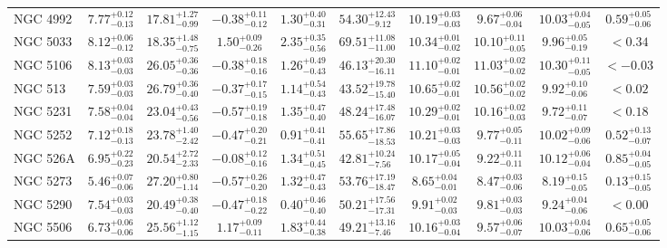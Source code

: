 \documentclass[onecolumn]{mn2e}
\begin{document}
\begin{landscape}
{\begin{center}
\begin{longtable}{lccccccccc}
NGC 4992 & $7.77_{-0.13}^{+0.12}$ & $17.81_{-0.99}^{+1.27}$ & $-0.38_{-0.12}^{+0.11}$ & $1.30_{-0.31}^{+0.40}$ &$54.30_{-9.12}^{+12.43}$ & $10.19_{-0.03}^{+0.03}$ & $9.67_{-0.04}^{+0.06}$ & $10.03_{-0.05}^{+0.04}$ & $0.59_{-0.06}^{+0.05}$ \\
NGC 5033 & $8.12_{-0.12}^{+0.06}$ & $18.35_{-0.75}^{+1.48}$ & $1.50_{-0.26}^{+0.09}$ & $2.35_{-0.56}^{+0.35}$ &$69.51_{-11.00}^{+11.08}$ & $10.34_{-0.02}^{+0.01}$ & $10.10_{-0.05}^{+0.11}$ & $9.96_{-0.19}^{+0.05}$ & $<0.34$ \\
NGC 5106 & $8.13_{-0.03}^{+0.03}$ & $26.05_{-0.36}^{+0.36}$ & $-0.38_{-0.16}^{+0.18}$ & $1.26_{-0.43}^{+0.49}$ &$46.13_{-16.11}^{+20.30}$ & $11.10_{-0.01}^{+0.02}$ & $11.03_{-0.02}^{+0.02}$ & $10.30_{-0.05}^{+0.11}$ & $<-0.03$ \\
NGC 513 & $7.59_{-0.03}^{+0.03}$ & $26.79_{-0.40}^{+0.36}$ & $-0.37_{-0.15}^{+0.17}$ & $1.14_{-0.43}^{+0.54}$ &$43.52_{-15.40}^{+19.78}$ & $10.65_{-0.01}^{+0.02}$ & $10.56_{-0.02}^{+0.02}$ & $9.92_{-0.06}^{+0.10}$ & $<0.02$ \\
NGC 5231 & $7.58_{-0.04}^{+0.04}$ & $23.04_{-0.56}^{+0.43}$ & $-0.57_{-0.18}^{+0.19}$ & $1.35_{-0.40}^{+0.47}$ &$48.24_{-16.07}^{+17.48}$ & $10.29_{-0.01}^{+0.02}$ & $10.16_{-0.03}^{+0.02}$ & $9.72_{-0.07}^{+0.11}$ & $<0.18$ \\
NGC 5252 & $7.12_{-0.13}^{+0.18}$ & $23.78_{-2.42}^{+1.40}$ & $-0.47_{-0.21}^{+0.20}$ & $0.91_{-0.41}^{+0.41}$ &$55.65_{-18.53}^{+17.86}$ & $10.21_{-0.03}^{+0.03}$ & $9.77_{-0.11}^{+0.05}$ & $10.02_{-0.06}^{+0.09}$ & $0.52_{-0.07}^{+0.13}$ \\
NGC 526A & $6.95_{-0.23}^{+0.22}$ & $20.54_{-2.33}^{+2.72}$ & $-0.08_{-0.16}^{+0.12}$ & $1.34_{-0.45}^{+0.51}$ &$42.81_{-7.56}^{+10.24}$ & $10.17_{-0.04}^{+0.05}$ & $9.22_{-0.11}^{+0.11}$ & $10.12_{-0.04}^{+0.06}$ & $0.85_{-0.05}^{+0.04}$ \\
NGC 5273 & $5.46_{-0.06}^{+0.07}$ & $27.20_{-1.14}^{+0.80}$ & $-0.57_{-0.20}^{+0.26}$ & $1.32_{-0.43}^{+0.47}$ &$53.76_{-18.47}^{+17.19}$ & $8.65_{-0.01}^{+0.04}$ & $8.47_{-0.06}^{+0.03}$ & $8.19_{-0.05}^{+0.15}$ & $0.13_{-0.05}^{+0.15}$ \\
NGC 5290 & $7.54_{-0.03}^{+0.03}$ & $20.49_{-0.40}^{+0.38}$ & $-0.47_{-0.22}^{+0.18}$ & $0.40_{-0.40}^{+0.46}$ &$50.21_{-17.31}^{+17.56}$ & $9.91_{-0.03}^{+0.02}$ & $9.81_{-0.03}^{+0.03}$ & $9.24_{-0.06}^{+0.04}$ & $<0.00$ \\
NGC 5506 & $6.73_{-0.06}^{+0.06}$ & $25.56_{-1.15}^{+1.12}$ & $1.17_{-0.11}^{+0.09}$ & $1.83_{-0.38}^{+0.44}$ &$49.21_{-7.46}^{+13.16}$ & $10.16_{-0.04}^{+0.03}$ & $9.57_{-0.07}^{+0.06}$ & $10.03_{-0.06}^{+0.04}$ & $0.65_{-0.06}^{+0.05}$ \\

\end{longtable}
\end{center}}
\end{landscape}
\end{document}
